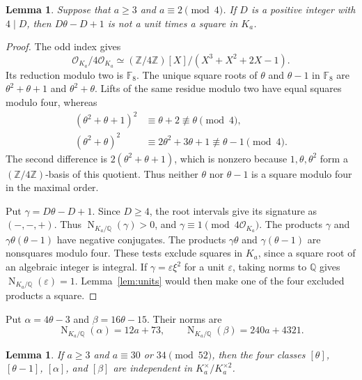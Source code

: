 \documentclass[11pt,leqno,oneside,letterpaper]{amsart}
\newtheorem{lemma}[theorem]{Lemma}
\theoremstyle{remark}
\numberwithin{equation}{section}
\newcommand{\Q}{\mathbb Q}
\newcommand{\Z}{\mathbb Z}
\newcommand{\F}{\mathbb F}
\DeclareMathOperator{\Nm}{N}
\begin{document}
\begin{lemma}\label{lem:obstruction}
  Suppose that $a\geq3$ and $a\equiv2\pmod4$. If $D$ is a positive integer with $4\mid D$, then $D\theta-D+1$ is not a unit times a square in $K_a$.
\end{lemma}

\begin{proof}
  The odd index gives
  \[
    \mathcal O_{K_a}/4\mathcal O_{K_a}\simeq
    (\Z/4\Z)[X]/(X^3+X^2+2X-1).
  \]
  Its reduction modulo two is $\F_8$. The unique square roots of $\theta$ and $\theta-1$ in $\F_8$ are $\theta^2+\theta+1$ and $\theta^2+\theta$. Lifts of the same residue modulo two have equal squares modulo four, whereas
  \begin{align*}
    (\theta^2+\theta+1)^2 & \equiv\theta+2\not\equiv\theta\pmod4,              \\
    (\theta^2+\theta)^2   & \equiv2\theta^2+3\theta+1\not\equiv\theta-1\pmod4.
  \end{align*}
  The second difference is $2(\theta^2+\theta+1)$, which is nonzero because $1,\theta,\theta^2$ form a $(\Z/4\Z)$-basis of this quotient. Thus neither $\theta$ nor $\theta-1$ is a square modulo four in the maximal order.

  Put $\gamma=D\theta-D+1$. Since $D\geq4$, the root intervals give its signature as $(-,-,+)$. Thus $\Nm_{K_a/\Q}(\gamma)>0$, and $\gamma\equiv1\pmod{4\mathcal O_{K_a}}$. The products $\gamma$ and $\gamma\theta(\theta-1)$ have negative conjugates. The products $\gamma\theta$ and $\gamma(\theta-1)$ are nonsquares modulo four. These tests exclude squares in $K_a$, since a square root of an algebraic integer is integral. If $\gamma=\varepsilon\xi^2$ for a unit $\varepsilon$, taking norms to $\Q$ gives $\Nm_{K_a/\Q}(\varepsilon)=1$. Lemma~\ref{lem:units} would then make one of the four excluded products a square.
\end{proof}

Put $\alpha=4\theta-3$ and $\beta=16\theta-15$. Their norms are
\begin{equation}\label{eq:alpha-beta}
  \Nm_{K_a/\Q}(\alpha)=12a+73,\qquad \Nm_{K_a/\Q}(\beta)=240a+4321.
\end{equation}

\begin{lemma}\label{lem:four-classes}
  If $a\geq3$ and $a\equiv30$ or $34\pmod{52}$, then the four classes $[\theta]$, $[\theta-1]$, $[\alpha]$, and $[\beta]$ are independent in $K_a^\times/K_a^{\times2}$.
\end{lemma}
\end{document}
